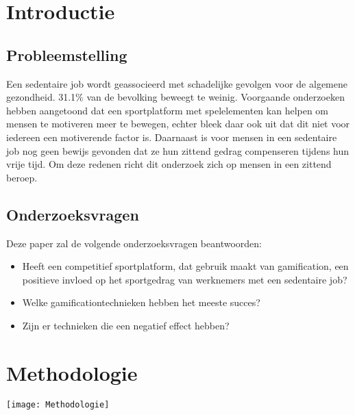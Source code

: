 \documentclass[a0,portrait]{hogent-poster}
\begin{document}
\begin{multicols}{2} %

\section{Introductie}

\subsection{Probleemstelling}
Een sedentaire job wordt geassocieerd met schadelijke gevolgen voor de algemene gezondheid. 31.1\% van de bevolking beweegt te weinig. Voorgaande onderzoeken hebben aangetoond dat een sportplatform met spelelementen kan helpen om mensen te motiveren meer te bewegen, echter bleek daar ook uit dat dit niet voor iedereen een motiverende factor is. Daarnaast is voor mensen in een sedentaire job nog geen bewijs gevonden dat ze hun zittend gedrag compenseren tijdens hun vrije tijd. Om deze redenen richt dit onderzoek zich op mensen in een zittend beroep.

\subsection{Onderzoeksvragen}

Deze paper zal de volgende onderzoeksvragen beantwoorden:

\begin{itemize}
    \item Heeft een competitief sportplatform, dat gebruik maakt van gamification, een positieve invloed op het sportgedrag van werknemers met een sedentaire job?
    \item Welke gamificationtechnieken hebben het meeste succes?
    \item Zijn er technieken die een negatief effect hebben?
\end{itemize}

\section{Methodologie}

\begin{center}
    \captionsetup{type=figure}
    \texttt{[image: Methodologie]}
\end{center}


\end{multicols}
\end{document}
